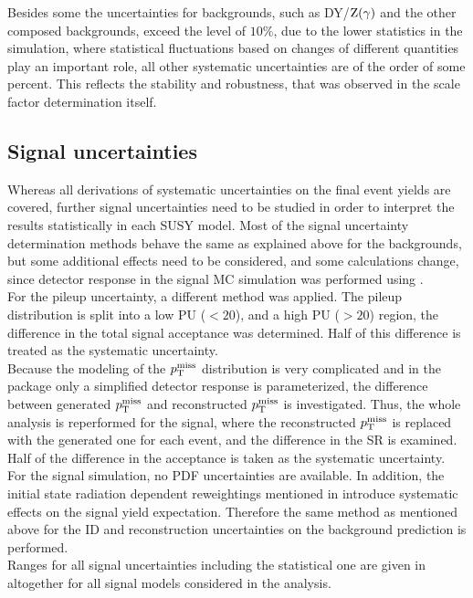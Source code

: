 Besides some the uncertainties for backgrounds, such as DY/$\mathrm{Z}(\gamma)$ and the other composed backgrounds, exceed the level of $10\%$, due to the lower statistics in the simulation, where statistical fluctuations based on changes of different quantities play an important role, all other systematic uncertainties are of the order of some percent. This reflects the stability and robustness, that was observed in the scale factor determination itself.


\subsection{Signal uncertainties}
Whereas all derivations of systematic uncertainties on the final event yields are covered, further signal uncertainties need to be studied in order to interpret the results statistically in each SUSY model.
Most of the signal uncertainty determination methods behave the same as explained above for the backgrounds, but some additional effects need to be considered, and some calculations change, since detector response in the signal MC simulation was performed using \FASTSIM.\\
For the pileup uncertainty, a different method was applied. The pileup distribution is split into a low PU ($<20$), and a high PU ($>20$) region, the difference in the total signal acceptance was determined. Half of this difference is treated as the systematic uncertainty.\\
Because the modeling of the $p_{\mathrm{T}}^\text{miss}$ distribution is very complicated and in the \FASTSIM package only a simplified detector response is parameterized, the difference between generated $p_{\mathrm{T}}^\text{miss}$ and reconstructed $p_{\mathrm{T}}^\text{miss}$ is investigated. Thus, the whole analysis is reperformed for the signal, where the reconstructed $p_{\mathrm{T}}^\text{miss}$ is replaced with the generated one for each event, and the difference in the SR is examined. Half of the difference in the acceptance is taken as the systematic uncertainty.\\
For the signal simulation, no PDF uncertainties are available. In addition, the initial state radiation dependent reweightings mentioned in  introduce systematic effects on the signal yield expectation. Therefore the same method as mentioned above for the ID and reconstruction uncertainties on the background prediction is performed.\\
Ranges for all signal uncertainties including the statistical one are given in  altogether for all signal models considered in the analysis.
